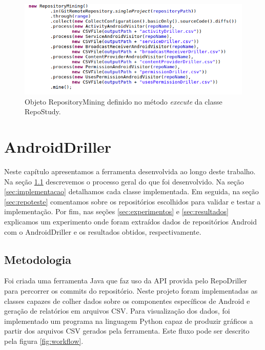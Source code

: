 \documentclass[a4paper,12pt]{article}
\begin{document}
\begin{figure}[h]
\centering
\includegraphics[width=\linewidth]{imgs/repostudy.png}
\caption{Objeto RepositoryMining definido no método \textit{execute} da classe RepoStudy.}
\label{fig:repostudy}
\end{figure}



\newpage
\section{AndroidDriller}%

Neste capítulo apresentamos a ferramenta desenvolvida ao longo deste trabalho. Na seção \ref{sec:metodologia} descrevemos o processo geral do que foi desenvolvido. Na seção \ref{sec:implementacao} detalhamos cada classe implementada. Em seguida, na seção \ref{sec:repoteste} comentamos sobre os repositórios escolhidos para validar e testar a implementação. Por fim, nas seções \ref{sec:experimentos} e \ref{sec:resultados} explicamos um experimento onde foram extraídos dados de repositórios Android com o AndroidDriller  e os resultados obtidos, respectivamente.

\subsection{Metodologia}
\label{sec:metodologia}
Foi criada uma ferramenta Java que faz uso da API provida pelo RepoDriller para percorrer os commits do repositório. Neste projeto foram implementadas as classes capazes de colher dados sobre os componentes específicos de Android e geração de relatórios em arquivos CSV. Para visualização dos dados, foi implementado um programa na linguagem Python capaz de produzir gráficos a partir dos arquivos CSV gerados pela ferramenta. Este fluxo pode ser descrito pela figura \ref{fig:workflow}.
\end{document}
